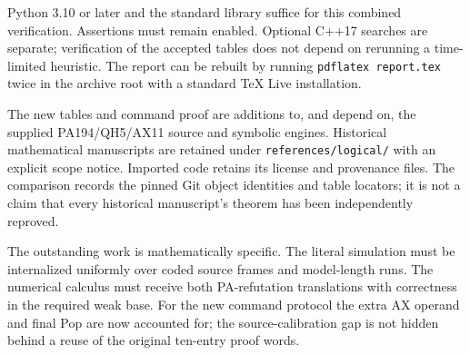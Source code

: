 \documentclass[11pt]{article}
\newcommand{\file}[1]{\nolinkurl{#1}}
\begin{document}
Python 3.10 or later and the standard library suffice for this combined
verification. Assertions must remain enabled. Optional C++17 searches
are separate; verification of the accepted tables does not depend on
rerunning a time-limited heuristic. The report can be rebuilt by
running \file{pdflatex report.tex} twice in the archive root with a
standard TeX Live installation.

The new tables and command proof are additions to, and depend on,
the supplied PA194/QH5/AX11 source and symbolic engines. Historical
mathematical manuscripts are retained under \file{references/logical/}
with an explicit scope notice. Imported code retains its license and
provenance files. The comparison records the pinned Git object
identities and table locators; it is not a claim that every historical
manuscript's theorem has been independently reproved.

The outstanding work is mathematically specific. The literal simulation
must be internalized uniformly over coded source frames and model-length
runs. The numerical calculus must receive both PA-refutation translations
with correctness in the required weak base. For the new command
protocol the extra AX operand and final Pop are now accounted for;
the source-calibration gap is not hidden behind a reuse of the original
ten-entry proof words.
\end{document}
